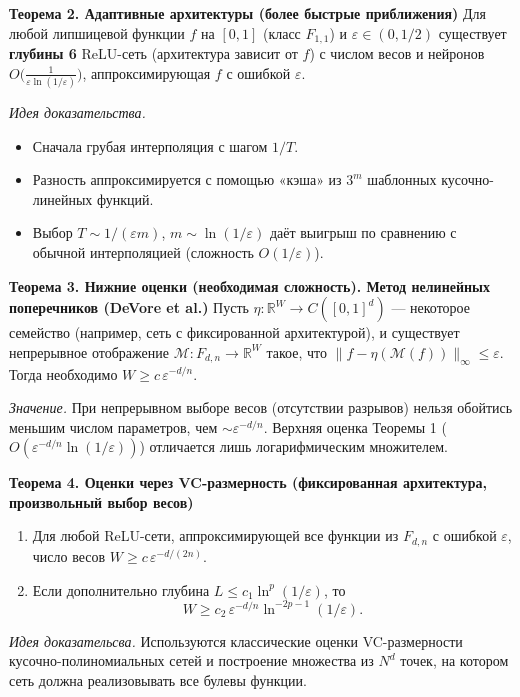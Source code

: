 \documentclass[12pt]{article}
\begin{document}
	
	\textbf{Теорема 2. Адаптивные архитектуры (более быстрые приближения)} Для любой липшицевой функции \(f\) на \([0,1]\) (класс \(F_{1,1}\)) и \(\varepsilon\in(0,1/2)\) существует \textbf{глубины 6} ReLU-сеть (архитектура зависит от \(f\)) с числом весов и нейронов \(O\bigl(\frac{1}{\varepsilon\ln(1/\varepsilon)}\bigr)\), аппроксимирующая \(f\) с ошибкой \vspace{5mm} \(\varepsilon\).
	
	\emph{Идея доказательства. }  
	\begin{itemize}
		\item Сначала грубая интерполяция с шагом \(1/T\).
		\item Разность аппроксимируется с помощью «кэша» из \(3^m\) шаблонных кусочно-линейных функций.
		\item Выбор \(T\sim 1/(\varepsilon m)\), \(m\sim \ln(1/\varepsilon)\) даёт выигрыш по сравнению с обычной интерполяцией (сложность \(O(1/\varepsilon)\)).
	\end{itemize}
	
	
	\textbf{Теорема 3. Нижние оценки (необходимая сложность). Метод нелинейных поперечников (DeVore et al.)} Пусть \(\eta:\mathbb{R}^W\to C([0,1]^d)\) — некоторое семейство (например, сеть с фиксированной архитектурой), и существует непрерывное отображение \(\mathcal{M}:F_{d,n}\to\mathbb{R}^W\) такое, что \(\|f-\eta(\mathcal{M}(f))\|_\infty\le\varepsilon\). Тогда необходимо \(W\ge c\,\varepsilon^{-d/n}\).
	
	\emph{Значение.} При непрерывном выборе весов (отсутствии разрывов) нельзя обойтись меньшим числом параметров, чем \(\sim \varepsilon^{-d/n}\). Верхняя оценка Теоремы 1 (\(O(\varepsilon^{-d/n}\ln(1/\varepsilon))\)) отличается лишь логарифмическим множителем.
	
\vspace{5mm}
	\textbf{Теорема 4. Оценки через VC-размерность (фиксированная архитектура, произвольный выбор весов)}  
	\begin{enumerate}
		\item Для любой ReLU-сети, аппроксимирующей все функции из \(F_{d,n}\) с ошибкой \(\varepsilon\), число весов \(W \ge c\,\varepsilon^{-d/(2n)}\).
		\item Если дополнительно глубина \(L\le c_1\ln^p(1/\varepsilon)\), то  
		\[
		W \ge c_2\,\varepsilon^{-d/n}\ln^{-2p-1}(1/\varepsilon).
		\]
	\end{enumerate}
	\emph{Идея доказательсва.} Используются классические оценки VC-размерности кусочно-полиномиальных сетей и построение множества из \(N^d\) точек, на котором сеть должна реализовывать все булевы функции.
	
\end{document}
